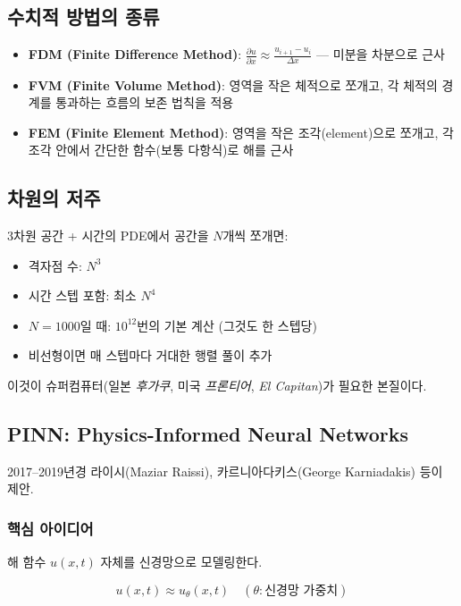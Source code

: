 \documentclass[11pt,a4paper]{article}
\begin{document}
\subsection{수치적 방법의 종류}

\begin{itemize}
\item \textbf{FDM (Finite Difference Method)}: $\frac{\partial u}{\partial x} \approx \frac{u_{i+1} - u_i}{\Delta x}$ --- 미분을 차분으로 근사
\item \textbf{FVM (Finite Volume Method)}: 영역을 작은 체적으로 쪼개고, 각 체적의 경계를 통과하는 흐름의 보존 법칙을 적용
\item \textbf{FEM (Finite Element Method)}: 영역을 작은 조각(element)으로 쪼개고, 각 조각 안에서 간단한 함수(보통 다항식)로 해를 근사
\end{itemize}

\subsection{차원의 저주}

3차원 공간 + 시간의 PDE에서 공간을 $N$개씩 쪼개면:

\begin{itemize}
\item 격자점 수: $N^3$
\item 시간 스텝 포함: 최소 $N^4$
\item $N = 1000$일 때: $10^{12}$번의 기본 계산 (그것도 한 스텝당)
\item 비선형이면 매 스텝마다 거대한 행렬 풀이 추가
\end{itemize}

이것이 슈퍼컴퓨터(일본 \emph{후가쿠}, 미국 \emph{프론티어}, \emph{El Capitan})가 필요한 본질이다.

\subsection{PINN: Physics-Informed Neural Networks}

2017--2019년경 라이시(Maziar Raissi), 카르니아다키스(George Karniadakis) 등이 제안.

\subsubsection{핵심 아이디어}

해 함수 $u(x, t)$ 자체를 신경망으로 모델링한다.

\begin{equation}
u(x, t) \approx u_\theta(x, t) \quad (\theta: \text{신경망 가중치})
\end{equation}
\end{document}
